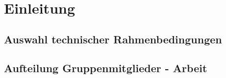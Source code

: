 \chapter{Einleitung}

\section{Auswahl technischer Rahmenbedingungen}

\section{Aufteilung Gruppenmitglieder - Arbeit}

